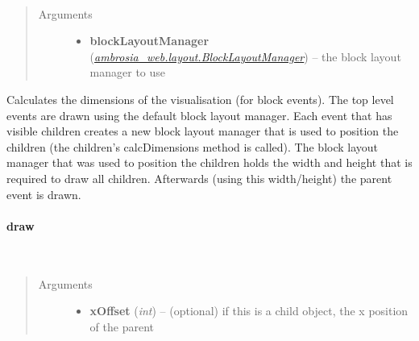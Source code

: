 \documentclass[letterpaper,10pt,english]{sphinxmanual}
\begin{document}
\begin{fulllineitems}
\label{ambrosia_web.event.BlockEvent:ambrosia_web.event.BlockEvent.calcDimensions}~\begin{quote}\begin{description}
\item[{Arguments}] \leavevmode\begin{itemize}
\item {} 
\textbf{blockLayoutManager} ({\hyperref[ambrosia_web.layout.BlockLayoutManager:ambrosia_web.layout.BlockLayoutManager]{\emph{ambrosia\_web.layout.BlockLayoutManager}}}) -- the block layout manager to use

\end{itemize}

\end{description}\end{quote}

\end{fulllineitems}


Calculates the dimensions of the visualisation (for block events). The top level events are drawn using the
default block layout manager. Each event that has visible children creates a new block layout manager that
is used to position the children (the children's calcDimensions method is called). The block layout manager
that was used to position the children holds the width and height that is required to draw all children.
Afterwards (using this width/height) the parent event is drawn.


\paragraph{draw}
\label{ambrosia_web.event.BlockEvent:draw}

\begin{fulllineitems}
\label{ambrosia_web.event.BlockEvent:ambrosia_web.event.BlockEvent.draw}~\begin{quote}\begin{description}
\item[{Arguments}] \leavevmode\begin{itemize}
\item {} 
\textbf{xOffset} (\emph{int}) -- (optional) if this is a child object, the x position of the parent

\end{itemize}

\end{description}\end{quote}

\end{fulllineitems}
\end{document}
